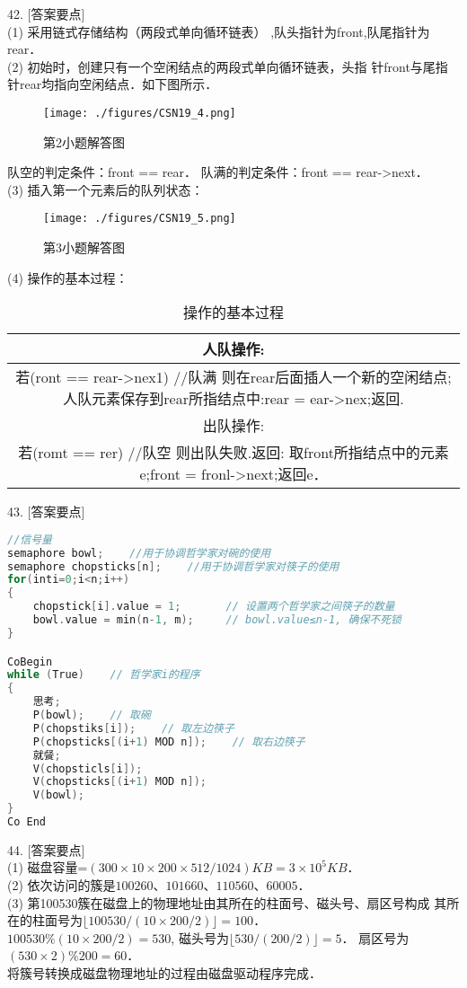 42. [答案要点] \\
(1) 采用链式存储结构（两段式单向循环链表） ,队头指针为front,队尾指针为rear． \\
(2) 初始时，创建只有一个空闲结点的两段式单向循环链表，头指
针front与尾指针rear均指向空闲结点．如下图所示．
\begin{figure}[ht]
\centering
\texttt{[image: ./figures/CSN19\_4.png]}
\caption{第2小题解答图} \label{CSN19_fig4}
\end{figure}
队空的判定条件：front == rear．
队满的判定条件：front == rear->next． \\
(3) 插入第一个元素后的队列状态：
\begin{figure}[ht]
\centering
\texttt{[image: ./figures/CSN19\_5.png]}
\caption{第3小题解答图} \label{CSN19_fig5}
\end{figure}
(4) 操作的基本过程： \\
\begin{table}[ht]
\centering
\caption{操作的基本过程}\label{CSN19_tab1}
\begin{tabular}{|c|}
\hline
人队操作: \\
\hline
若(ront == rear->nex1)    //队满
则在rear后面插人一个新的空闲结点;
人队元素保存到rear所指结点中:rear = ear->nex;返回. \\
\hline
出队操作: \\
\hline
若(romt == rer)    //队空
则出队失败.返回:
取front所指结点中的元素e;front = fronl->next;返回e． \\
\hline
\end{tabular}
\end{table}

43. [答案要点]
\begin{lstlisting}[language=cpp]
//信号量
semaphore bowl;    //用于协调哲学家对碗的使用
semaphore chopsticks[n];    //用于协调哲学家对筷子的使用
for(inti=0;i<n;i++)
{
    chopstick[i].value = 1;       // 设置两个哲学家之间筷子的数量
    bowl.value = min(n-1, m);     // bowl.value≤n-1, 确保不死锁
}

CoBegin
while (True)    // 哲学家i的程序
{
    思考;
    P(bowl);    // 取碗
    P(chopstiks[i]);    // 取左边筷子
    P(chopsticks[(i+1) MOD n]);    // 取右边筷子
    就餐;
    V(chopsticls[i]);
    V(chopsticks[(i+1) MOD n]);
    V(bowl);
}
Co End
\end{lstlisting}

44. [答案要点] \\
(1) 磁盘容量=$(300\times10\times200\times512/1024)KB=3\times10^5KB$． \\
(2) 依次访问的簇是$100 260$、$101 660$、$110 560$、$60 005$． \\
(3) 第100530簇在磁盘上的物理地址由其所在的柱面号、磁头号、扇区号构成
其所在的柱面号为$\lfloor100530/(10\times200/2)\rfloor=100$． \\
$100530\%(10\times200/2)=530$, 磁头号为$\lfloor530/(200/2)\rfloor=5$．
扇区号为$(530\times2)\%200=60$． \\
将簇号转换成磁盘物理地址的过程由磁盘驱动程序完成．

